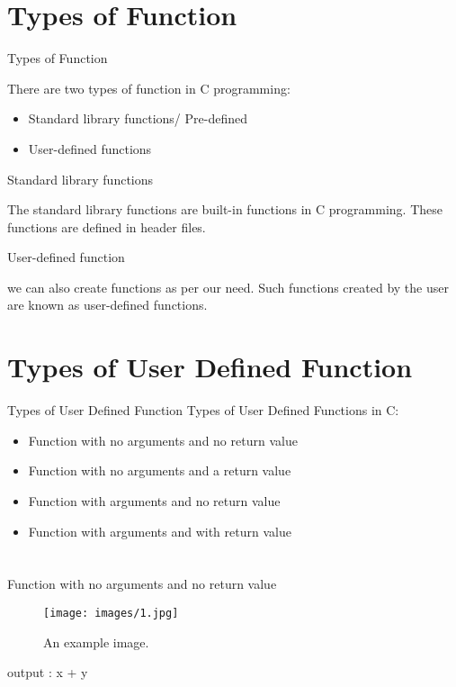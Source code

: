 \documentclass{beamer}
\begin{document}
\section{Types of Function}
\begin{frame}{Types of Function}

There are two types of function in C programming:
\begin{itemize}
    \item Standard library functions/ Pre-defined
    \item   User-defined functions
\end{itemize}
			
 { \color{orange}\Large Standard library functions} 

	The standard library functions are built-in functions in C programming.
	These functions are defined in header files. 

	{\color{orange}\Large User-defined function}
	
	we can also create functions as per our need. 
	Such functions created by the user are known as user-defined functions.


	



    
\end{frame}

\section{Types of User Defined Function}
\begin{frame}{Types of User Defined Function}
Types of User Defined Functions in C:

    \begin{itemize}
        \item Function with no arguments and no return value
	\item Function with no arguments and a return value
	\item Function with arguments and no return value
	\item Function with arguments and with return value
    

        
    \end{itemize}
\end{frame}

\section{}
\begin{frame}{Function with no arguments and no return value}

\begin{figure}
\centering
    \texttt{[image: images/1.jpg]}
\caption{An example image.}
\end{figure}

output : x + y
    
\end{frame}
\end{document}

